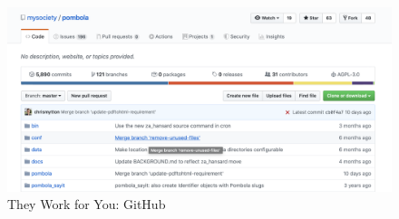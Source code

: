 \begin{figure}[h]
  \centering
  \includegraphics[scale=0.3]{images/they-work-for-you-implementation-open-source-github}
  \caption{They Work for You: GitHub}
  \label{fig:they-work-for-you-implementation-open-source-github}
\end{figure}